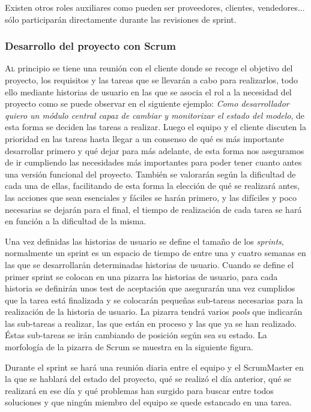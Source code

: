 \documentclass[12pt,a4paper,spanish]{book} %
\begin{document}
Existen otros roles auxiliares como pueden ser proveedores, clientes, vendedores... sólo participarán directamente durante las revisiones de sprint.

\subsubsection{Desarrollo del proyecto con Scrum}

\lettrine{A}{l} principio se tiene una reunión con el cliente donde se recoge el objetivo del proyecto, los requisitos y las tareas que se llevarán a cabo para realizarlos, todo ello mediante historias de usuario en las que se asocia el rol a la necesidad del proyecto como se puede observar en el siguiente ejemplo: \emph{Como desarrollador quiero un módulo central capaz de cambiar y monitorizar el estado del modelo}, de esta forma se deciden las tareas a realizar. Luego el equipo y el cliente discuten la prioridad en las tareas hasta llegar a un consenso de qué es más importante desarrollar primero y qué dejar para más adelante, de esta forma nos aseguramos de ir cumpliendo las necesidades más importantes para poder tener cuanto antes una versión funcional del proyecto. También se valorarán según la dificultad de cada una de ellas, facilitando de esta forma la elección de qué se realizará antes, las acciones que sean esenciales y fáciles se harán primero, y las difíciles y poco necesarias se dejarán para el final, el tiempo de realización de cada tarea se hará en función a la dificultad de la misma.

Una vez definidas las historias de usuario se define el tamaño de los \emph{sprints}, normalmente un sprint es un espacio de tiempo de entre una y cuatro semanas en las que se desarrollarán determinadas historias de usuario. Cuando se define el primer sprint se colocan en una pizarra las historias de usuario, para cada historia se definirán unos test de aceptación que asegurarán una vez cumplidos que la tarea está finalizada y se colocarán pequeñas sub-tareas necesarias para la realización de la historia de usuario. La pizarra tendrá varios \emph{pools} que indicarán las sub-tareas a realizar, las que están en proceso y las que ya se han realizado. Éstas sub-tareas se irán cambiando de posición según sea su estado. La morfología de la pizarra de Scrum se muestra en la siguiente figura.


Durante el sprint se hará una reunión diaria entre el equipo y el ScrumMaster en la que se hablará del estado del proyecto, qué se realizó el día anterior, qué se realizará en ese día y qué problemas han surgido para buscar entre todos soluciones y que ningún miembro del equipo se quede estancado en una tarea.
\end{document}
